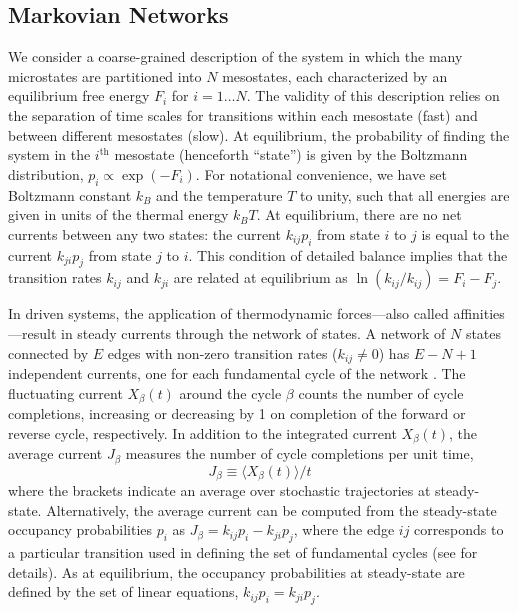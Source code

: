 \begin{appendices}
\subsection{Markovian Networks}

We consider a coarse-grained description of the system in which the many microstates are partitioned into $N$ mesostates, each characterized by an equilibrium free energy $F_i$ for $i=1\dots N$.  The validity of this description relies on the separation of time scales for transitions within each mesostate (fast) and between different mesostates (slow).  At equilibrium, the probability of finding the system in the $i^{\text{th}}$ mesostate (henceforth ``state'') is given by the Boltzmann distribution, $p_i \propto \exp(-F_i)$. For notational convenience, we have set Boltzmann constant $k_B$ and the temperature $T$ to unity, such that all energies are given in units of the thermal energy $k_B T$.  At equilibrium, there are no net currents between any two states: the current $k_{ij} p_i$ from state $i$ to $j$ is equal to the current $k_{ji} p_j$ from state $j$ to $i$.  This condition of detailed balance implies that the transition rates $k_{ij}$ and $k_{ji}$ are related  at equilibrium as $\ln(k_{ij}/k_{ij})=F_i-F_j$. 

In driven systems, the application of thermodynamic forces---also called affinities---result in steady currents through the network of states.  A network of $N$ states connected by $E$ edges with non-zero transition rates ($k_{ij}\neq 0$) has $E-N+1$ independent currents, one for each fundamental cycle of the network \cite{schnakenberg1976network}.  The fluctuating current $X_{\beta}(t)$ around the cycle $\beta$ counts the number of cycle completions, increasing or decreasing by 1 on completion of the forward or reverse cycle, respectively.  In addition to the integrated current $X_{\beta}(t)$, the average current $J_{\beta}$ measures the number of cycle completions per unit time,
\begin{equation}
    J_{\beta} \equiv \langle X_{\beta}(t)\rangle / t
\end{equation}
where the brackets indicate an average over stochastic trajectories at steady-state.  Alternatively, the average current can be computed from the steady-state occupancy probabilities $p_i$ as $J_{\beta} = k_{ij} p_i - k_{ji} p_j$, where the edge $ij$ corresponds to a particular transition used in defining the set of fundamental cycles (see \cite{schnakenberg1976network} for details).  As at equilibrium, the occupancy probabilities at steady-state are defined by the set of linear equations, $k_{ij} p_i = k_{ji} p_j$.


\end{appendices}
